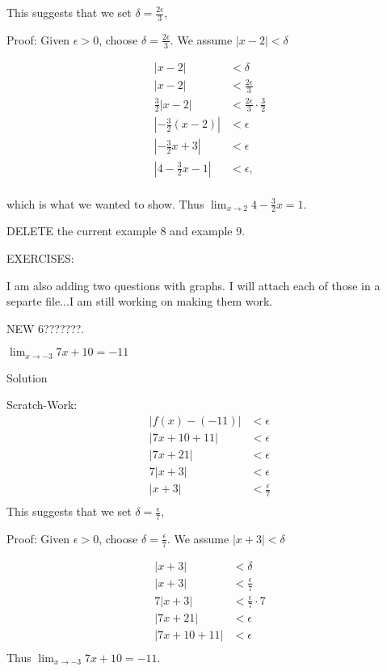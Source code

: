 \documentclass[10pt]{article}
\newcommand{\ds}{\displaystyle}
\begin{document}
This suggests that we set $\delta=\frac{2\epsilon}{3}$,

Proof:
Given $\epsilon>0$, choose $\ds \delta=\frac{2\epsilon}{3}$. We assume $|x-2|<\delta$

\begin{align*}
|x - 2| &< \delta \\
|x - 2| &< \frac{2\epsilon}{3}\\
\frac{3}{2}|x - 2| &< \frac{2\epsilon}{3}\cdot \frac{3}{2}\\
|-\frac{3}{2}(x-2)|&< \epsilon \\
|-\frac{3}{2}x+3|&< \epsilon  \\
|4-\frac{3}{2}x-1|&< \epsilon,  \\
\end{align*}

which is what we wanted to show. Thus  $\ds \lim_{x\to 2} 4-\frac{3}{2}x=1$.

DELETE the current example 8 and example 9.



EXERCISES:

I am also adding two questions with graphs.  I will attach each of those in a separte file...I am still working on making them work.

NEW 6???????.

$\ds \lim_{x\to{-3}} 7x+10=-11$

Solution   

Scratch-Work:
 \small
\begin{align*}
|f(x)-(-11)|&<\epsilon \\
|7x+10+11|&<\epsilon \\
|7x+21|&<\epsilon\\
7|x+3|&<\epsilon \\
|x+3|&<\frac{\epsilon}{7}\\
\end{align*}
\normalsize
This suggests that we set $\delta=\frac{\epsilon}{7}$,

Proof:
Given $\epsilon>0$, choose $\ds \delta=\frac{\epsilon}{7}$. We assume $|x+3|<\delta$

\small
\begin{align*}
|x+3| &< \delta \\
|x+3| &< \frac{\epsilon}{7} \\
7|x +3| &< \frac{\epsilon}{7}\cdot 7\\
|7x+21|&< \epsilon \\
|7x+10+11|&< \epsilon  \\
\end{align*}
\normalsize
Thus  $\ds \lim_{x\to{-3}} 7x+10=-11$.
\end{document}
